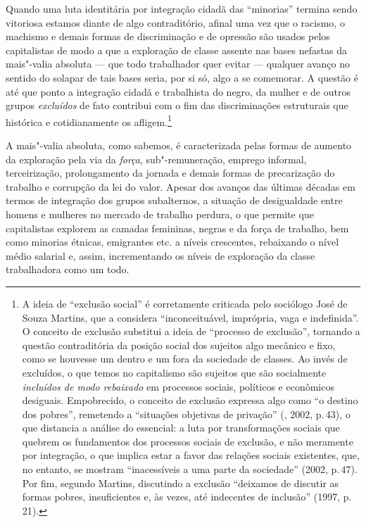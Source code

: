 Quando uma luta identitária por integração cidadã das ``minorias''
termina sendo vitoriosa estamos diante de algo contraditório, afinal uma
vez que o racismo, o machismo e demais formas de discriminação e de
opressão são usados pelos capitalistas de modo a que a exploração de
classe assente nas bases nefastas da mais"-valia absoluta --- que todo
trabalhador quer evitar --- qualquer avanço no sentido do solapar de tais
bases seria, por si só, algo a se comemorar. A questão é até que ponto a
integração cidadã e trabalhista do negro, da mulher e de outros grupos
\emph{excluídos} de fato contribui com o fim das discriminações
estruturais que histórica e cotidianamente os afligem.\footnote{A ideia
  de ``exclusão social'' é corretamente criticada pelo sociólogo José de
  Souza Martins, que a considera ``inconceituável, imprópria, vaga e
  indefinida''. O conceito de exclusão substitui a ideia de ``processo
  de exclusão'', tornando a questão contraditória da posição social dos
  sujeitos algo mecânico e fixo, como se houvesse um dentro e um fora da
  sociedade de classes. Ao invés de excluídos, o que temos no
  capitalismo são sujeitos que são socialmente \emph{incluídos de modo
  rebaixado} em processos sociais, políticos e econômicos desiguais.
  Empobrecido, o conceito de exclusão expressa algo como ``o destino dos
  pobres'', remetendo a ``situações objetivas de privação'' (,
  2002, p.\,43), o que distancia a análise do essencial: a luta por
  transformações sociais que quebrem os fundamentos dos processos
  sociais de exclusão, e não meramente por integração, o que implica
  estar a favor das relações sociais existentes, que, no entanto, se
  mostram ``inacessíveis a uma parte da sociedade'' (2002, p.\,47). Por
  fim, segundo Martins, discutindo a exclusão ``deixamos de discutir as
  formas pobres, insuficientes e, às vezes, até indecentes de inclusão''
  (1997, p.\,21).}

A mais"-valia absoluta, como sabemos, é caracterizada pelas formas de
aumento da exploração pela via da \emph{força}, sub"-remuneração, emprego
informal, terceirização, prolongamento da jornada e demais formas de
precarização do trabalho e corrupção da lei do valor. Apesar dos avanços
das últimas décadas em termos de integração dos grupos subalternos, a
situação de desigualdade entre homens e mulheres no mercado de trabalho
perdura, o que permite que capitalistas explorem as camadas femininas,
negras e  da força de trabalho, bem como minorias étnicas,
emigrantes etc. a níveis crescentes, rebaixando o nível médio salarial
e, assim, incrementando os níveis de exploração da classe trabalhadora
como um todo.

